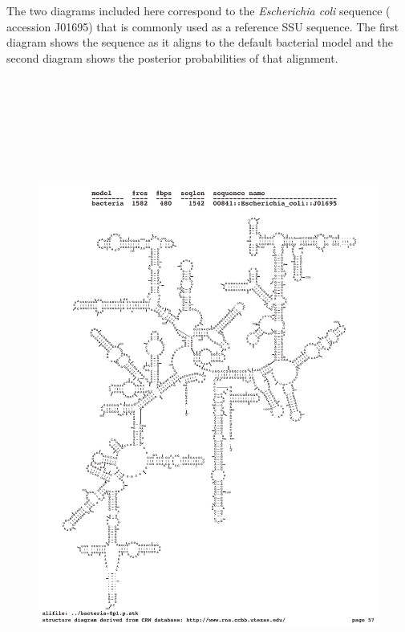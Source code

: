 The two diagrams included here correspond to the
\emph{Escherichia coli} sequence ( accession J01695) that
is commonly used as a reference SSU sequence. The first diagram shows
the sequence as it aligns to the default bacterial model and the
second diagram shows the posterior probabilities of that alignment.

\newpage

\begin{figure}[h]
\includegraphics[height=8.5in]{Figures/ecoli-seq}
\label{fig:ecoli-seq}
\end{figure}

\newpage

